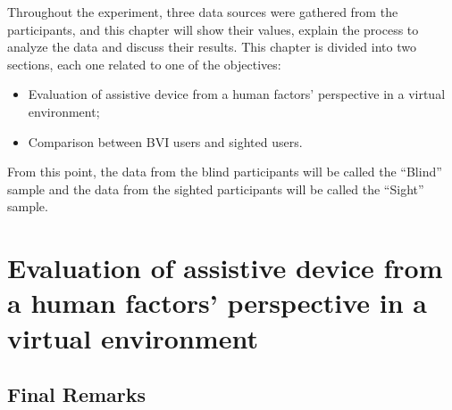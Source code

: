 

Throughout the experiment, three data sources were gathered from the participants, and this chapter will show their values, explain the process to analyze the data and discuss their results. This chapter is divided into two sections, each one related to one of the objectives:

\begin{itemize}
    \item Evaluation of assistive device from a human factors’ perspective in a virtual environment;
    \item Comparison between BVI users and sighted users.
\end{itemize}

From this point, the data from the blind participants will be called the “Blind” sample and the data from the sighted participants will be called the “Sight” sample.

\section{Evaluation of assistive device from a human factors’ perspective in a virtual environment}

%

 

\subsection{Final Remarks}


% 
%

